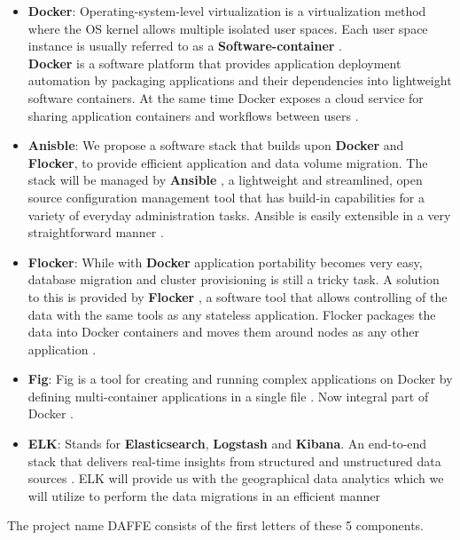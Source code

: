 \documentclass{article}
\begin{document}
\begin{itemize}
    \item{\textbf{Docker}: Operating-system-level virtualization is a virtualization method where the OS kernel allows multiple isolated user spaces. Each user space instance is usually referred to as a  \textbf{Software-container} \cite{OSLV}.\\
\textbf{Docker} \cite{Docker} is a software platform that provides application deployment automation by packaging applications and their dependencies into lightweight software containers. At the same time Docker exposes a cloud service for sharing application containers and workflows between users \cite{whatisdocker}.}
    \item{\textbf{Anisble}: We propose a software stack that builds upon \textbf{Docker} and \textbf{Flocker}, to provide efficient application and data volume migration. The stack will be managed by \textbf{Ansible} \cite{ansible}, a lightweight and streamlined, open source configuration management tool that has build-in capabilities for a variety of everyday administration tasks. Ansible is easily extensible in a very straightforward manner \cite{ansiblemod}.} 
    \item{\textbf{Flocker}: While with \textbf{Docker} application portability becomes very easy, database migration and cluster provisioning is still a tricky task. A solution to this is provided by \textbf{Flocker} \cite{flocker}, a software tool that allows controlling of the data with the same tools as any stateless application. Flocker packages the data into Docker containers and moves them around nodes as any other application \cite{flockerdoc}.}
    \item{\textbf{Fig}: Fig is a tool for creating and running complex applications on Docker by defining multi-container applications in a single file \cite{fig}. Now integral part of Docker \cite{figgit}.}
    \item{\textbf{ELK}: Stands for \textbf{Elasticsearch}, \textbf{Logstash} and \textbf{Kibana}. An end-to-end stack that delivers real-time insights from structured and unstructured data sources \cite{elk}. ELK will provide us with the geographical data analytics which we will utilize to perform the data migrations in an efficient manner}
\end{itemize}
The project name DAFFE consists of the first letters of these 5 components.
\end{document}
